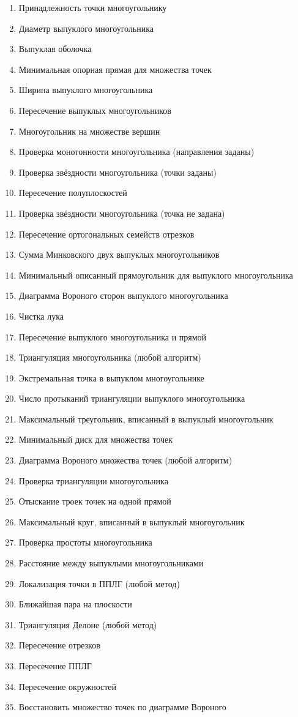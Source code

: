\documentclass[12pt]{article}
\begin{document}
\begin{enumerate}
	\item Принадлежность точки многоугольнику
	\item Диаметр выпуклого многоугольника
	\item Выпуклая оболочка
	\item Минимальная опорная прямая для множества точек
	\item Ширина выпуклого многоугольника
	\item Пересечение выпуклых многоугольников
	\item Многоугольник на множестве вершин
	\item Проверка монотонности многоугольника (направления заданы)
	\item Проверка звёздности многоугольника (точки заданы)
	\item Пересечение полуплоскостей
	\item Проверка звёздности многоугольника (точка не задана)
	\item Пересечение ортогональных семейств отрезков
	\item Сумма Минковского двух выпуклых многоугольников
	\item Минимальный описанный прямоугольник для выпуклого многоугольника
	\item Диаграмма Вороного сторон выпуклого многоугольника
	\item Чистка лука
	\item Пересечение выпуклого многоугольника и прямой
	\item Триангуляция многоугольника (любой алгоритм)
	\item Экстремальная точка в выпуклом многоугольнике
	\item Число протыканий триангуляции выпуклого многоугольника
	\item Максимальный треугольник, вписанный в выпуклый многоугольник
	\item Минимальный диск для множества точек
	\item Диаграмма Вороного множества точек (любой алгоритм)
	\item Проверка триангуляции многоугольника
	\item Отыскание троек точек на одной прямой
		\pagebreak
	\item Максимальный круг, вписанный в выпуклый многоугольник
	\item Проверка простоты многоугольника
	\item Расстояние между выпуклыми многоугольниками
	\item Локализация точки в ППЛГ (любой метод)
	\item Ближайшая пара на плоскости
	\item Триангуляция Делоне (любой метод)
	\item Пересечение отрезков
	\item Пересечение ППЛГ
	\item Пересечение окружностей
	\item Восстановить множество точек по диаграмме Вороного

\end{enumerate}
\end{document}
